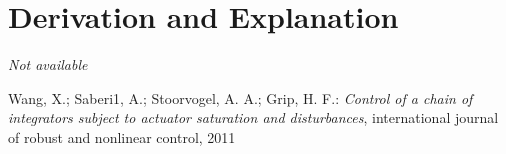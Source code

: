 \documentclass[10pt,a4paper]{article}
\begin{document}
		

	
	\section{Derivation and Explanation} %
	
	\textit{Not available}
	
	
	\begin{thebibliography}{10}		
		Wang, X.; Saberi1, A.; Stoorvogel, A. A.; Grip, H. F.: 
		\textit{Control of a chain of integrators subject to actuator saturation and disturbances}, international journal of robust and nonlinear control, 2011
	\end{thebibliography}
\end{document}
